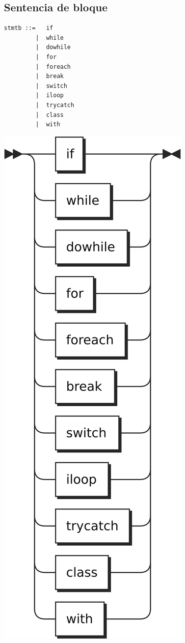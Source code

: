 \subsection{Sentencia de bloque}
\begin{multicols}{2}
\begin{lstlisting}[style=nonumbers]
stmtb ::=   if
         |  while
         |  dowhile
         |  for
         |  foreach
         |  break
         |  switch
         |  iloop
         |  trycatch
         |  class
         |  with
\end{lstlisting}  	
\columnbreak
\begin{center}
\includegraphics[scale=0.7]{diagram/stmtb.png} \\
\end{center}
\end{multicols}
